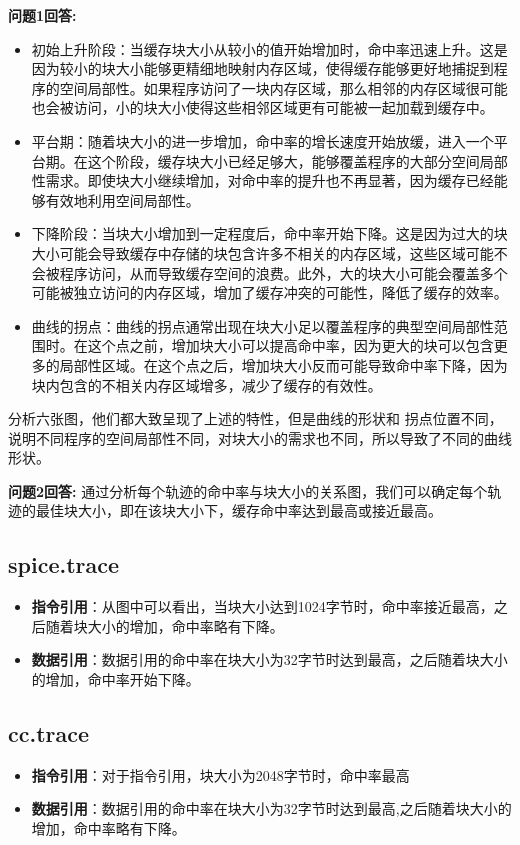 \documentclass[12pt,hyperref,a4paper,UTF8]{ctexart}
\begin{document}
\textbf{问题1回答:}
\begin{itemize}
    \item 初始上升阶段：当缓存块大小从较小的值开始增加时，命中率迅速上升。这是因为较小的块大小能够更精细地映射内存区域，使得缓存能够更好地捕捉到程序的空间局部性。如果程序访问了一块内存区域，那么相邻的内存区域很可能也会被访问，小的块大小使得这些相邻区域更有可能被一起加载到缓存中。
\item 平台期：随着块大小的进一步增加，命中率的增长速度开始放缓，进入一个平台期。在这个阶段，缓存块大小已经足够大，能够覆盖程序的大部分空间局部性需求。即使块大小继续增加，对命中率的提升也不再显著，因为缓存已经能够有效地利用空间局部性。

\item 下降阶段：当块大小增加到一定程度后，命中率开始下降。这是因为过大的块大小可能会导致缓存中存储的块包含许多不相关的内存区域，这些区域可能不会被程序访问，从而导致缓存空间的浪费。此外，大的块大小可能会覆盖多个可能被独立访问的内存区域，增加了缓存冲突的可能性，降低了缓存的效率。

\item 曲线的拐点：曲线的拐点通常出现在块大小足以覆盖程序的典型空间局部性范围时。在这个点之前，增加块大小可以提高命中率，因为更大的块可以包含更多的局部性区域。在这个点之后，增加块大小反而可能导致命中率下降，因为块内包含的不相关内存区域增多，减少了缓存的有效性。

\end{itemize}
分析六张图，他们都大致呈现了上述的特性，但是曲线的形状和
拐点位置不同，说明不同程序的空间局部性不同，对块大小的需求也不同，所以导致了不同的曲线形状。

\textbf{问题2回答:}
通过分析每个轨迹的命中率与块大小的关系图，我们可以确定每个轨迹的最佳块大小，即在该块大小下，缓存命中率达到最高或接近最高。

\subsection{spice.trace}
\begin{itemize}
  \item \textbf{指令引用}：从图中可以看出，当块大小达到1024字节时，命中率接近最高，之后随着块大小的增加，命中率略有下降。
  \item \textbf{数据引用}：数据引用的命中率在块大小为32字节时达到最高，之后随着块大小的增加，命中率开始下降。
\end{itemize}

\subsection{cc.trace}
\begin{itemize}
  \item \textbf{指令引用}：对于指令引用，块大小为2048字节时，命中率最高
  \item \textbf{数据引用}：数据引用的命中率在块大小为32字节时达到最高,之后随着块大小的增加，命中率略有下降。
\end{itemize}
\end{document}
